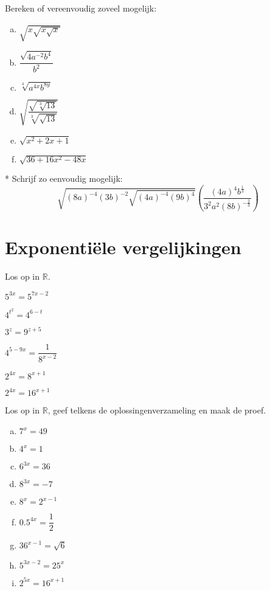 \documentclass[12pt,twoside]{article}
\begin{document}
\begin{oefening}
Bereken of vereenvoudig zoveel mogelijk:
\begin{multicols}{3}
\begin{enumerate}[(a)]
  \itemsep.5em
  \item $\sqrt{x\sqrt{x\sqrt{x}}}$
  \item $\dfrac{\sqrt{4a^{-2}b^4}}{b^2}$
  \item $\sqrt[4]{a^{4x}b^{8y}}$
  \item $\sqrt{\dfrac{\sqrt{\sqrt[3]{13}}}{\sqrt[3]{\sqrt{13}}}}$
  \item $\sqrt{x^2+2x+1}$
  \item $\sqrt{36+16x^2-48x}$
\end{enumerate}
\end{multicols}
\end{oefening}

\begin{oefening}*
Schrijf zo eenvoudig mogelijk:
$$\sqrt{\left(8a\right)^{-4}\left(3b\right)^{-2}\sqrt{\left(4a\right)^{-4}\left(9b\right)^4}}\left(\dfrac{\left(4a\right)^4b^{\frac{1}{3}}}{3^2a^2\left(8b\right)^{-\frac{2}{3}}}\right)$$
\end{oefening}

\pagebreak
\section{Exponentiële vergelijkingen}

\begin{oefening}
Los op in $\mathbb{R}$.
\begin{exlist}{3}
  \item $5^{3x}=5^{7x-2}$
  \item $4^{t^2}=4^{6-t}$
  \item $3^z=9^{z+5}$
  \item $4^{5-9x}=\dfrac{1}{8^{x-2}}$
  \item $2^{4x}=8^{x+1}$
  \item $2^{4x}=16^{x+1}$
\end{exlist}
\end{oefening}


\begin{oefening}
Los op in $\mathbb{R}$, geef telkens de oplossingenverzameling en maak de proef.
\begin{multicols}{3}
\begin{enumerate}[(a)]
  \itemsep.5em
  \item $7^x=49$
  \item $4^x=1$
  \item $6^{3x}=36$
  \item $8^{3x}=-7$
  \item $8^x=2^{x-1}$
  \item $0.5^{4x}=\dfrac{1}{2}$
  \item $36^{x-1}=\sqrt{6}$
  \item $5^{3x-2}=25^x$
  \item $2^{5x}=16^{x+1}$
\end{enumerate}
\end{multicols}
\end{oefening}
\end{document}
